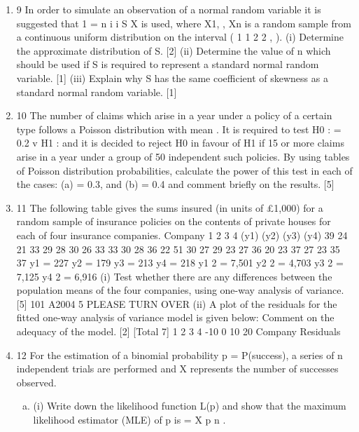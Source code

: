 \documentclass[a4paper,12pt]{article}
\begin{document}
\begin{enumerate}
\item
9 In order to simulate an observation of a normal random variable it is suggested that
1
=
n
i
i
S X
is used, where X1, , Xn is a random sample from a continuous uniform distribution
on the interval ( 1 1
2 2 , ).
(i) Determine the approximate distribution of S. [2]
(ii) Determine the value of n which should be used if S is required to represent a
standard normal random variable. [1]
(iii) Explain why S has the same coefficient of skewness as a standard normal
random variable. [1]
\item 10 The number of claims which arise in a year under a policy of a certain type follows a
Poisson distribution with mean . It is required to test
H0 : = 0.2 v H1 :
and it is decided to reject H0 in favour of H1 if 15 or more claims arise in a year under
a group of 50 independent such policies.
By using tables of Poisson distribution probabilities, calculate the power of this test in
each of the cases:
(a) = 0.3, and
(b) = 0.4
and comment briefly on the results. [5]
\item 11 The following table gives the sums insured (in units of £1,000) for a random sample
of insurance policies on the contents of private houses for each of four insurance
companies.
Company
1 2 3 4
(y1) (y2) (y3) (y4)
39 24 21 33
29 28 30 26
33 33 30 28
36 22 51 30
27 29 23 27
36 20 23 37
27 23 35 37
y1 = 227 y2 = 179 y3 = 213 y4 = 218
y1
2 = 7,501 y2
2 = 4,703 y3
2 = 7,125 y4
2 = 6,916
(i) Test whether there are any differences between the population means of the
four companies, using one-way analysis of variance.
[5]
101 A2004 5 PLEASE TURN OVER
(ii) A plot of the residuals for the fitted one-way analysis of variance model is
given below:
Comment on the adequacy of the model. [2]
[Total 7]
1 2 3 4
-10
0
10
20
Company
Residuals
\item 12 For the estimation of a binomial probability p = P(success), a series of n independent
trials are performed and X represents the number of successes observed.
\begin{enumerate}[(a)]
    \item (i) Write down the likelihood function L(p) and show that the maximum
likelihood estimator (MLE) of p is =
X
p
n
.


\end{enumerate}
\end{enumerate}
\end{document}
